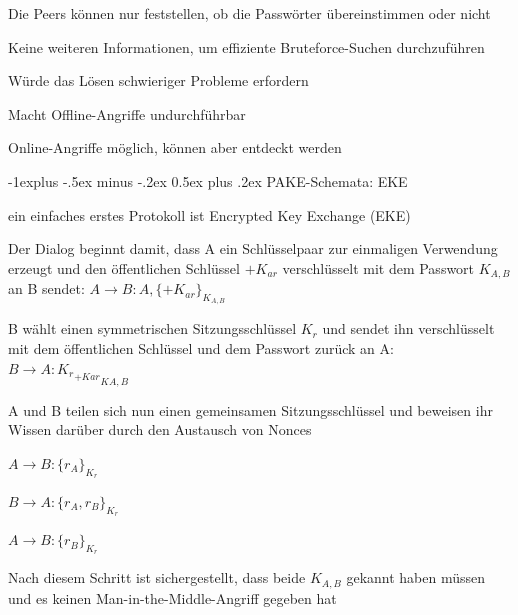 \documentclass[a4paper]{article}
\makeatletter
\renewcommand{\subsection}{\@startsection{subsection}{2}{0mm}%
 {-1explus -.5ex minus -.2ex}%
 {0.5ex plus .2ex}%
 {\normalfont\normalsize\bfseries}}
\makeatother
\begin{document}
\begin{multicols}{3}
\begin{itemize*}
\begin{itemize*}
                  \item Die Peers können nur feststellen, ob die Passwörter übereinstimmen oder nicht
                  \item Keine weiteren Informationen, um effiziente Bruteforce-Suchen durchzuführen
                  \item Würde das Lösen schwieriger Probleme erfordern%
                  \item Macht Offline-Angriffe undurchführbar
                  \item Online-Angriffe möglich, können aber entdeckt werden
            \end{itemize*}
      \end{itemize*}

      \subsection{PAKE-Schemata: EKE}
      \begin{itemize*}
            \item ein einfaches erstes Protokoll ist Encrypted Key Exchange (EKE)
            \item Der Dialog beginnt damit, dass A ein Schlüsselpaar zur einmaligen Verwendung erzeugt und den öffentlichen Schlüssel $+K_{ar}$ verschlüsselt mit dem Passwort $K_{A,B}$ an B sendet: $A\rightarrow B:A,\{+K_{ar}\}_{K_{A,B}}$
            \item B wählt einen symmetrischen Sitzungsschlüssel $K_r$ und sendet ihn verschlüsselt mit dem öffentlichen Schlüssel und dem Passwort zurück an A: $B\rightarrow A:{{K_r}_{{+K}{ar}}}_{{K}{A,B}}$
            \item A und B teilen sich nun einen gemeinsamen Sitzungsschlüssel und beweisen ihr Wissen darüber durch den Austausch von Nonces
            \begin{enumerate*}
                  \item $A\rightarrow B:\{r_A\}_{K_r}$
                  \item $B\rightarrow A:\{r_A,r_B\}_{K_r}$
                  \item $A\rightarrow B:\{r_B\}_{K_r}$
            \end{enumerate*}
            \item Nach diesem Schritt ist sichergestellt, dass beide $K_{A,B}$ gekannt haben müssen und es keinen Man-in-the-Middle-Angriff gegeben hat
      \end{itemize*}


\end{multicols}
\end{document}
